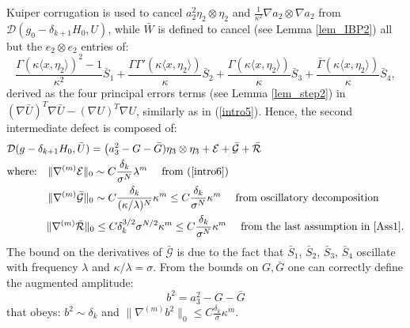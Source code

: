 \documentclass[reqno,twoside,11pt]{amsart}
\numberwithin{equation}{section}
\theoremstyle{plain}
\theoremstyle{definition}
\begin{document}
Kuiper corrugation is used to cancel $a_2^2\eta_2\otimes \eta_2$ 
and $\frac{1}{\kappa^2}\nabla a_{2}\otimes \nabla a_{2}$
from $\mathcal{D}(g_0-\delta_{k+1}H_0, U)$, 
while $\bar W$ is defined to cancel (see Lemma \ref{lem_IBP2}) all but the $e_2\otimes e_2$ entries of:
$$ \frac{\Gamma(\kappa \langle x,
    \eta_2\rangle)^2-1}{\kappa^2} \bar S_1 +
  \frac{\Gamma\Gamma'(\kappa \langle x, \eta_2\rangle)}{\kappa}\bar S_2 +
\frac{\Gamma(\kappa \langle x, \eta_2\rangle)}{\kappa}\bar S_3 + \frac{\bar\Gamma(\kappa
 \langle x, \eta_2\rangle)}{\kappa}\bar S_4,$$
derived as the four principal errors terms (see Lemma
\ref{lem_step2}) in $(\nabla \bar U)^T\nabla \bar U
- (\nabla U)^T\nabla U$, similarly as in (\ref{intro5}).
Hence, the second intermediate defect is composed of:
\begin{equation}\label{intro7}
\begin{split}
& \mathcal{D}(g-\delta_{k+1}H_0, \bar U)  =
 \big( a_3^2 - G-\bar G) \eta_3\otimes \eta_3 + \mathcal{E} +
 \bar{\mathcal{G}} + \bar{\mathcal{R}}
\\ & \mbox{where:} \quad \|\nabla^{(m)}\mathcal{E}\|_0\sim
C \frac{\delta_k}{\sigma^N} \lambda^m \quad \mbox{ from (\ref{intro6})}\\
& \qquad\quad \;\; \; \|\nabla^{(m)}\bar{\mathcal{G}}\|_0\sim
C\frac{\delta_k}{(\kappa/\lambda)^{N}}\kappa^m  \leq 
C\frac{\delta_k}{\sigma^{N}}\kappa^m \quad \mbox{ from oscillatory
  decomposition}\\
& \qquad\quad \;\; \, \|\nabla^{(m)}\bar{\mathcal{R}}\|_0\leq C
\delta_k^{3/2}\sigma^{N/2}\kappa^m\leq C \frac{\delta_k}{\sigma^{N}}\kappa^m 
\quad \mbox{ from the last assumption in \ref{Ass1}}.
\end{split}
\end{equation}
The bound on the derivatives of $\bar{\mathcal{G}}$ is due to the fact that 
$\bar S_1$, $\bar S_2$, $\bar S_3$, $\bar S_4$ oscillate with
frequency $\lambda$ and $\kappa/\lambda=\sigma$.
From the bounds on $G, \bar G$ one can correctly define the augmented amplitude:
$$b^2=a_{3}^2 - G - \bar  G$$ 
that obeys: $ b^2\sim \delta_k$ and $\|\nabla^{(m)} b^2\|_0\leq
C \frac{\delta_k}{\sigma}\kappa^m$.

\medskip
\end{document}
